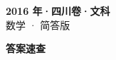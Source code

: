 \documentclass[zihao=-4, a4paper]{ctexart}
\begin{document}
\begin{center}
  {\Large\bfseries 2016 年·四川卷·文科}\\[4pt]
  {\large 数学 · 简答版}
\end{center}
\medskip
{}

\clearpage
{}
\begin{center}{\Large\bfseries 答案速查}\end{center}
\medskip

\end{document}
